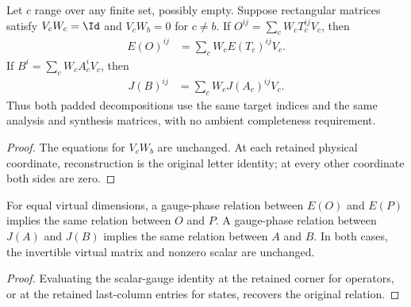 \begin{lemma}
    \leanok
    \label{thm:glm_triangular_padding_decomposition}
    Let $c$ range over any finite set, possibly empty. Suppose rectangular
    matrices satisfy $V_cW_c=\Id$ and $V_cW_b=0$ for $c\ne b$.
    If $O^{ij}=\sum_c W_cT_c^{ij}V_c$, then
    \begin{align}
        E(O)^{ij} & =\sum_c W_cE(T_c)^{ij}V_c.
        \label{eq:glm_padding_operator_decomposition}
    \end{align}
    If $B^i=\sum_c W_cA_c^iV_c$, then
    \begin{align}
        J(B)^{ij} & =\sum_c W_cJ(A_c)^{ij}V_c.
        \label{eq:glm_padding_state_decomposition}
    \end{align}
    Thus both padded decompositions use the same target indices and the
    same analysis and synthesis matrices, with no ambient completeness
    requirement.
\end{lemma}
\begin{proof}
    \leanok
    The equations for $V_cW_b$ are unchanged. At each retained physical
    coordinate, reconstruction is the original letter identity; at every
    other coordinate both sides are zero.
\end{proof}

\begin{lemma}
    \leanok
    \label{thm:glm_triangular_padding_gauge_restriction}
    For equal virtual dimensions, a gauge-phase relation between $E(O)$
    and $E(P)$ implies the same relation between $O$ and $P$.
    A gauge-phase relation between $J(A)$ and $J(B)$ implies the same
    relation between $A$ and $B$. In both cases, the invertible virtual
    matrix and nonzero scalar are unchanged.
\end{lemma}
\begin{proof}
    \leanok
    Evaluating the scalar-gauge identity at the retained corner for
    operators, or at the retained last-column entries for states, recovers
    the original relation.
\end{proof}

